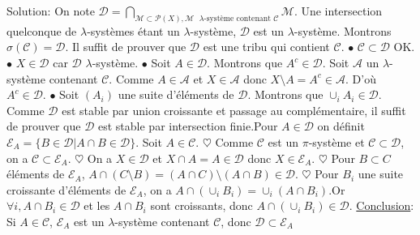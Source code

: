 \documentclass{report}
\begin{document}
Solution: On note $\displaystyle \mathcal D = \bigcap_{\mathcal M\subset \mathcal P(X), \mathcal M\text{ $\lambda$-système contenant $\mathcal C$}} \mathcal M$. \newline Une intersection quelconque de $\lambda$-systèmes étant un $\lambda$-système, $\mathcal D$ est un $\lambda$-système.\newline
Montrons $\sigma(\mathcal C) = \mathcal D$.\newline
\fbox{$\subset$} Il suffit de prouver que $\mathcal D$ est une tribu qui contient $\mathcal C$.\newline
$\bullet$ $\mathcal C \subset \mathcal D$   \quad OK.
\newline $\bullet$ $X\in \mathcal D$ car $\mathcal D$ $\lambda$-système.
\newline $\bullet$ Soit $A\in \mathcal D$. Montrons que $A^c\in \mathcal D$.\newline
Soit $\mathcal A$ un $\lambda$-système contenant $\mathcal C$. Comme $A\in \mathcal A$ et $X\in \mathcal A$ donc $X\setminus A = A^c\in \mathcal A$. D'où $A^c\in \mathcal D$.\newline
$\bullet$ Soit $(A_i)$ une suite d'éléments de $\mathcal D$. Montrons que $\cup_i A_i\in \mathcal D$. Comme $\mathcal D$ est stable par union croissante et passage au complémentaire,  il suffit de prouver que $\mathcal D$ est stable par intersection finie.\newline \newline Pour $A\in \mathcal D$ on définit $\mathcal E_A = \{B\in \mathcal D | A\cap B \in \mathcal D\}$.\newline
Soit $A\in \mathcal C$. \newline
$\heartsuit$ Comme $\mathcal C$ est un $\pi$-système et $\mathcal C \subset \mathcal D$, on a $\mathcal C \subset \mathcal E_A$. \newline
$\heartsuit$ On a $X\in \mathcal D$ et $X\cap A = A\in \mathcal D$ donc $X\in \mathcal E_A$. \newline
$\heartsuit$ Pour $B\subset C$ éléments de $\mathcal E_A$, $A\cap (C\setminus B) = (A\cap C)\setminus (A\cap B) \in \mathcal D$.\newline
$\heartsuit$ Pour $B_i$ une suite croissante d'éléments de $\mathcal E_A$, on a $A\cap (\cup_i B_i) = \cup_i (A\cap B_i)$.\newline Or $\forall i, A\cap B_i\in \mathcal D$ et les $A\cap B_i$ sont croissants, donc $A\cap (\cup_i B_i) \in \mathcal D$.\newline
\underline{Conclusion}: Si $A\in \mathcal C$,  $\mathcal E_A$ est un $\lambda$-système contenant $\mathcal C$, donc $\mathcal D \subset \mathcal E_A$ \newline \newline
\end{document}
